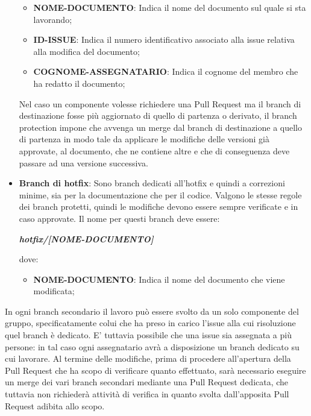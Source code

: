 \begin{itemize}
            \begin{itemize}
                \item \textbf{NOME-DOCUMENTO}: Indica il nome del documento sul quale si sta lavorando;
                \item \textbf{ID-ISSUE}: Indica il numero identificativo associato alla issue relativa alla modifica del documento;
                \item \textbf{COGNOME-ASSEGNATARIO}: Indica il cognome del membro che ha redatto il documento;
            \end{itemize}
            Nel caso un componente volesse richiedere una Pull Request ma il branch di destinazione fosse più aggiornato di quello di partenza o derivato, il branch protection
            impone che avvenga un merge dal branch di destinazione a quello di partenza in modo tale da applicare le modifiche delle versioni già approvate, al documento, che ne contiene
            altre e che di conseguenza deve passare ad una versione successiva.
            \item \textbf{Branch di hotfix}: Sono branch dedicati all'hotfix e quindi a correzioni minime, sia per la documentazione che per il codice. Valgono le stesse regole dei
            branch protetti, quindi le modifiche devono essere sempre verificate e in caso approvate.
            Il nome per questi branch deve essere:
            \begin{center}
                \textbf{\textit{hotfix/[NOME-DOCUMENTO]}}
            \end{center}
            dove:

            \begin{itemize}
                \item \textbf{NOME-DOCUMENTO}: Indica il nome del documento che viene modificata;
            \end{itemize}
        \end{itemize}

        In ogni branch secondario il lavoro può essere svolto da un solo componente del gruppo, specificatamente colui che ha preso in carico l'issue alla cui risoluzione quel branch è dedicato.
        E' tuttavia possibile che una issue sia assegnata a più persone: in tal caso ogni assegnatario avrà a disposizione un branch dedicato su cui lavorare. Al termine delle modifiche, prima di procedere all'apertura della
        Pull Request che ha scopo di verificare quanto effettuato, sarà necessario eseguire un merge dei vari branch secondari mediante una Pull Request dedicata, che tuttavia non richiederà attività
        di verifica in quanto svolta dall'apposita Pull Request adibita allo scopo.
         
